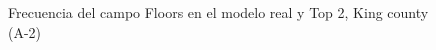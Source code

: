 \begin{figure}[H]
    \centering
    
    \caption{Frecuencia del campo Floors en el modelo real y Top 2, King county (A-2)}
    \label{frecuency-top2-floors}
\end{figure}